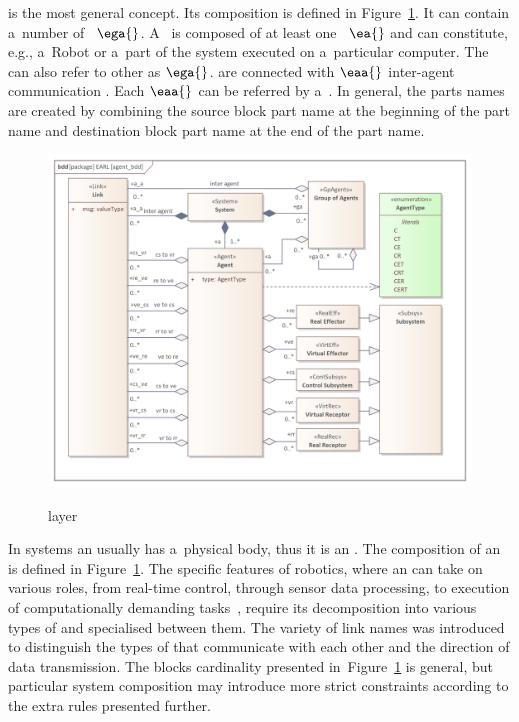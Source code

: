 \documentclass[11pt,oneside,a4paper]{article}
\newcommand{\Figure}[0]{Figure}
\begin{document}
	\System{} is the most general \EARL{} concept. Its composition is defined in \Figure{}~\ref{fig:warstwa_systemu}. It	can contain a~number of \GroupsofAgents{}~$\ega{}$. A~\GroupofAgents{} is composed of at least one \Agent{}~$\ea{}$ and can constitute, e.g., a~Robot or a~part of the system executed on a~particular computer. The \GroupofAgents{} can also refer to other \GroupofAgents{} as $\ega{}$.
	\Agents{} are connected with $\eaa{}$ inter-agent communication \Links{}. Each $\eaa{}$ \Link{} can be referred by a~\GroupofAgents{}. In general, the \Links{} parts names are created by combining the source block part name at the beginning of the \Link{} part name and destination block part name at the end of the \Link{} part name.
	

	\begin{figure}[H]
		\centering
		\begin{center}
			{\includegraphics[width=.9\columnwidth]{img/basic_earl_model/agent_bdd.png}}
		\end{center}
		\caption{\System{} layer} 
		\label{fig:warstwa_systemu}
	\end{figure}
	
	In \cyberphysical{} systems an \Agent{} usually has a~physical body, thus it is an \EmbodiedAgent{}. 
	The composition of an \Agent{} is defined in \Figure{}~\ref{fig:warstwa_systemu}.
	The specific features of robotics, where an \Agent{} can take on various roles, from real-time control, through sensor data processing, to execution of computationally demanding
	tasks~\cite{stigmergic:2009}, require its decomposition into various types of \Subsystems{} and specialised \Links{} between them.
	The variety of link names was introduced to distinguish the types of \Subsystems{} that communicate with each other and the direction of data transmission.
	The blocks cardinality presented in~\Figure{}~\ref{fig:warstwa_systemu} is general,
	but particular system composition may introduce more strict constraints according to the extra rules presented further.
	
\end{document}
